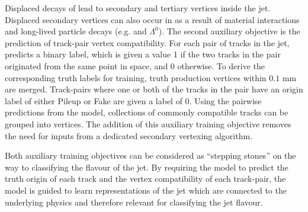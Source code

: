 Displaced decays of \bchadrons lead to secondary and tertiary vertices inside the jet.
Displaced secondary vertices can also occur in \ljets as a result of material interactions and long-lived particle decays (e.g. \Kshort and $\Lambda^0$).
The second auxiliary objective is the prediction of track-pair vertex compatibility. 
For each pair of tracks in the jet, \GNN predicts a binary label, which is given a value 1 if the two tracks in the pair originated from the same point in space, and 0 otherwise. 
To derive the corresponding truth labels for training, truth production vertices within $0.1$ mm are merged.
Track-pairs where one or both of the tracks in the pair have an origin label of either Pileup or Fake are given a label of 0.
Using the pairwise predictions from the model, collections of commonly compatible tracks can be grouped into vertices.
The addition of this auxiliary training objective removes the need for inputs from a dedicated secondary vertexing algorithm.

Both auxiliary training objectives can be considered as ``stepping stones'' on the way to classifying the flavour of the jet. 
By requiring the model to predict the truth origin of each track and the vertex compatibility of each track-pair, the model is guided to learn representations of the jet which are connected to the underlying physics and therefore relevant for classifying the jet flavour. 




